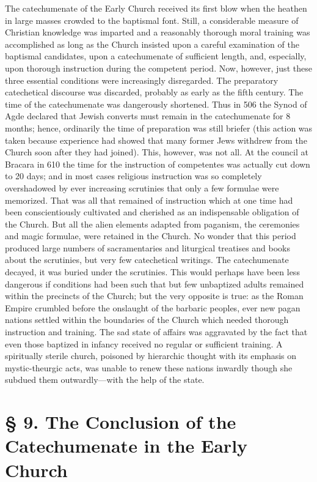 The catechumenate of the Early Church received its first blow when the heathen in large masses crowded to the baptismal font. Still, a considerable measure of Christian knowledge was imparted and a reasonably thorough moral training was accomplished as long as the Church insisted upon a careful examination of the baptismal candidates, upon a catechumenate of sufficient length, and, especially, upon thorough instruction during the competent period. Now, however, just these three essential conditions were increasingly disregarded. The preparatory catechetical discourse was discarded, probably as early as the fifth century. The time of the catechumenate was dangerously shortened. Thus in 506 the Synod of Agde declared that Jewish converts must remain in the catechumenate for 8 months; hence, ordinarily the time of preparation was still briefer (this action was taken because experience had showed that many former Jews withdrew from the Church soon after they had joined). This, however, was not all. At the council at Bracara in 610 the time for the instruction of competentes was actually cut down to 20 days; and in most cases religious instruction was so completely overshadowed by ever increasing scrutinies that only a few formulae were memorized. That was all that remained of instruction which at one time had been conscientiously cultivated and cherished as an indispensable obligation of the Church. But all the alien elements adapted from paganism,
the ceremonies and magic formulae, were retained in the Church. No wonder that this period produced large numbers of sacramentaries and liturgical treatises and books about the scrutinies, but very few catechetical writings. The catechumenate decayed, it was buried under the scrutinies. This would perhaps have been less dangerous if conditions had been such that but few unbaptized adults remained within the precincts of the Church; but the very opposite is true: as the Roman Empire crumbled before the onslaught of the barbaric peoples, ever new pagan nations settled within the boundaries of the Church which needed thorough instruction and training. The sad state of affairs was aggravated by the fact that even those baptized in infancy received no regular or sufficient training. A spiritually sterile church, poisoned by hierarchic thought with its emphasis on mystic-theurgic acts, was unable to renew these nations inwardly though she subdued them outwardly—with the help of the state.

\section[§ 9. Conclusion of the Catechumenate]{§ 9. The Conclusion of the Catechumenate in the Early Church}

